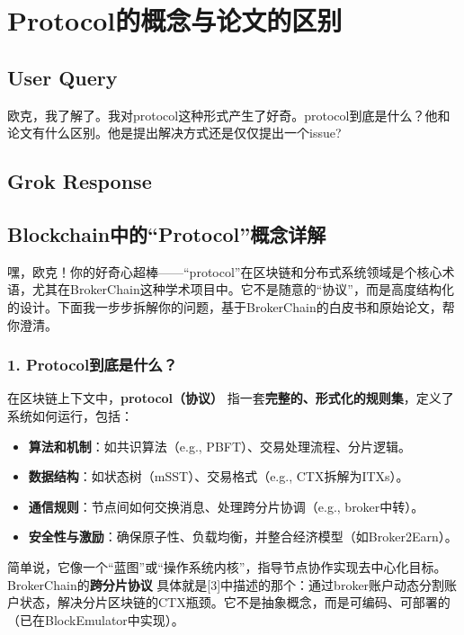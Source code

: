 \documentclass[a4paper,12pt]{ctexart}
\begin{document}
\newpage
\section*{Protocol的概念与论文的区别}
\subsection*{User Query}
欧克，我了解了。我对protocol这种形式产生了好奇。protocol到底是什么？他和论文有什么区别。他是提出解决方式还是仅仅提出一个issue?

\subsection*{Grok Response}
\subsection*{Blockchain中的“Protocol”概念详解}

嘿，欧克！你的好奇心超棒——“protocol”在区块链和分布式系统领域是个核心术语，尤其在BrokerChain这种学术项目中。它不是随意的“协议”，而是高度结构化的设计。下面我一步步拆解你的问题，基于BrokerChain的白皮书和原始论文，帮你澄清。

\subsubsection*{1. Protocol到底是什么？}
在区块链上下文中，\textbf{protocol（协议）} 指一套\textbf{完整的、形式化的规则集}，定义了系统如何运行，包括：
\begin{itemize}
  \item \textbf{算法和机制}：如共识算法（e.g., PBFT）、交易处理流程、分片逻辑。
  \item \textbf{数据结构}：如状态树（mSST）、交易格式（e.g., CTX拆解为ITXs）。
  \item \textbf{通信规则}：节点间如何交换消息、处理跨分片协调（e.g., broker中转）。
  \item \textbf{安全性与激励}：确保原子性、负载均衡，并整合经济模型（如Broker2Earn）。
\end{itemize}
简单说，它像一个“蓝图”或“操作系统内核”，指导节点协作实现去中心化目标。BrokerChain的\textbf{跨分片协议} 具体就是[3]中描述的那个：通过broker账户动态分割账户状态，解决分片区块链的CTX瓶颈。它不是抽象概念，而是可编码、可部署的（已在BlockEmulator中实现）。
\end{document}
